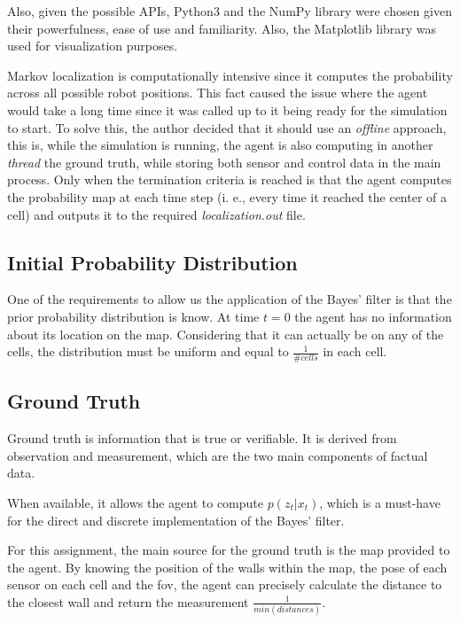 \documentclass[runningheads]{llncs}
\begin{document}
Also, given the possible APIs, Python3 and the NumPy \cite{harris2020array} library were chosen given their powerfulness, ease of use and familiarity. Also, the Matplotlib \cite{Hunter:2007} library was used for visualization purposes.

Markov localization is computationally intensive since it computes the probability across all possible robot positions. This fact caused the issue where the agent would take a long time since it was called up to it being ready for the simulation to start. To solve this, the author decided that it should use an \emph{offline} approach, this is, while the simulation is running, the agent is also computing in another \emph{thread} the ground truth, while storing both sensor and control data in the main process. Only when the termination criteria is reached is that the agent computes the probability map at each time step (i. e., every time it reached the center of a cell) and outputs it to the required \emph{localization.out} file.

\subsection{Initial Probability Distribution}
\label{subsec:initial_distribution}

One of the requirements to allow us the application of the Bayes' filter is that the prior probability distribution is know. At time $t = 0$ the agent has no information about its location on the map. Considering that it can actually be on any of the cells, the distribution must be uniform and equal to $\frac{1}{\# cells}$ in each cell.

\subsection{Ground Truth}
\label{subsec:ground_truth}

Ground truth is information that is true or verifiable. It is derived from observation and measurement, which are the two main components of factual data.

When available, it allows the agent to compute $p(z_t \vert x_t)$, which is a must-have for the direct and discrete implementation of the Bayes' filter.

For this assignment, the main source for the ground truth is the map provided to the agent. By knowing the position of the walls within the map, the pose of each sensor on each cell and the \gls{fov}, the agent can precisely calculate the distance to the closest wall and return the measurement $\frac{1}{min(distances)}$.
\end{document}

